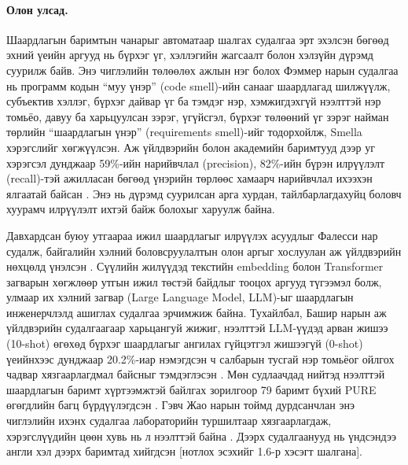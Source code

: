 \paragraph{Олон улсад.}
Шаардлагын баримтын чанарыг автоматаар шалгах судалгаа эрт эхэлсэн бөгөөд эхний үеийн аргууд нь бүрхэг үг, хэллэгийн жагсаалт болон хэлзүйн дүрэмд суурилж байв. Энэ чиглэлийн төлөөлөх ажлын нэг болох Фэммер нарын судалгаа нь программ кодын \enquote{муу үнэр} (code smell)-ийн санааг шаардлагад шилжүүлж, субъектив хэллэг, бүрхэг дайвар үг ба тэмдэг нэр, хэмжигдэхгүй нээлттэй нэр томьёо, давуу ба харьцуулсан зэрэг, үгүйсгэл, бүрхэг төлөөний үг зэрэг найман төрлийн \enquote{шаардлагын үнэр} (requirements smell)-ийг тодорхойлж, Smella хэрэгслийг хөгжүүлсэн. Аж үйлдвэрийн болон академийн баримтууд дээр уг хэрэгсэл дунджаар 59\%-ийн нарийвчлал (precision), 82\%-ийн бүрэн илрүүлэлт (recall)-тэй ажилласан бөгөөд үнэрийн төрлөөс хамаарч нарийвчлал ихээхэн ялгаатай байсан \cite{femmer2017}. Энэ нь дүрэмд суурилсан арга хурдан, тайлбарлагдахуйц боловч хуурамч илрүүлэлт ихтэй байж болохыг харуулж байна.

Давхардсан буюу утгаараа ижил шаардлагыг илрүүлэх асуудлыг Фалесси нар судалж, байгалийн хэлний боловсруулалтын олон аргыг хослуулан аж үйлдвэрийн нөхцөлд үнэлсэн \cite{falessi2013}. Сүүлийн жилүүдэд текстийн embedding болон Transformer загварын хөгжлөөр утгын ижил төстэй байдлыг тооцох аргууд түгээмэл болж, улмаар их хэлний загвар (Large Language Model, LLM)-ыг шаардлагын инженерчлэлд ашиглах судалгаа эрчимжиж байна. Тухайлбал, Башир нарын аж үйлдвэрийн судалгаагаар харьцангуй жижиг, нээлттэй LLM-үүдэд арван жишээ (10-shot) өгөхөд бүрхэг шаардлагыг ангилах гүйцэтгэл жишээгүй (0-shot) үеийнхээс дунджаар 20.2\%-иар нэмэгдсэн ч салбарын тусгай нэр томьёог ойлгох чадвар хязгаарлагдмал байсныг тэмдэглэсэн \cite{bashir2025}. Мөн судлаачдад нийтэд нээлттэй шаардлагын баримт хүртээмжтэй байлгах зорилгоор 79 баримт бүхий PURE өгөгдлийн багц бүрдүүлэгдсэн \cite{ferrari2017pure}. Гэвч Жао нарын тоймд дурдсанчлан энэ чиглэлийн ихэнх судалгаа лабораторийн туршилтаар хязгаарлагдаж, хэрэгслүүдийн цөөн хувь нь л нээлттэй байна \cite{zhao2021}. Дээрх судалгаанууд нь үндсэндээ англи хэл дээрх баримтад хийгдсэн [нотлох эсэхийг 1.6-р хэсэгт шалгана].

